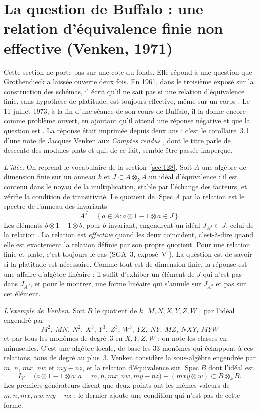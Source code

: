 \section[La question de Buffalo : une relation d'équivalence finie non effective (Venken, 1971)]{La question de Buffalo : une relation d'équivalence finie non effective (Venken, 1971)\protect{}}\label{sec:venken}

Cette section ne porte pas sur une cote du fonds. Elle répond à une question que Grothendieck a laissée ouverte deux fois. En 1961, dans le troisième exposé sur la construction des schémas, il écrit qu'il ne sait pas si une relation d'équivalence finie, sans hypothèse de platitude, est toujours effective, même sur un corps \cite{fga3}. Le 11 juillet 1973, à la fin d'une séance de son cours de Buffalo, il la donne encore comme problème ouvert, en ajoutant qu'il attend une réponse négative et que la question est . La réponse était imprimée depuis deux ans : c'est le corollaire~3.1 d'une note de Jacques Venken aux \emph{Comptes rendus} \cite{venken}, dont le titre parle de descente des modules plats et qui, de ce fait, semble être passée inaperçue.

\emph{L'idée.} On reprend le vocabulaire de la section~\ref{sec:128}. Soit $A$ une algèbre de dimension finie sur un anneau $k$ et $J \subset A \otimes_k A$ un idéal d'équivalence : il est contenu dans le noyau de la multiplication, stable par l'échange des facteurs, et vérifie la condition de transitivité. Le quotient de $\operatorname{Spec} A$ par la relation est le spectre de l'anneau des invariants
\[
  A^J = \{\, a \in A : a \otimes 1 - 1 \otimes a \in J \,\}.
\]
Les éléments $b \otimes 1 - 1 \otimes b$, pour $b$ invariant, engendrent un idéal $J_{A^J} \subset J$, celui de la relation . La relation est \emph{effective} quand les deux coïncident, c'est-à-dire quand elle est exactement la relation définie par son propre quotient. Pour une relation finie et plate, c'est toujours le cas (SGA~3, exposé~V \cite{sga3-1}). La question est de savoir si la platitude est nécessaire. Comme tout est de dimension finie, la réponse est une affaire d'algèbre linéaire : il suffit d'exhiber un élément de $J$ qui n'est pas dans $J_{A^J}$, et pour le montrer, une forme linéaire qui s'annule sur $J_{A^J}$ et pas sur cet élément.

\emph{L'exemple de Venken.} Soit $B$ le quotient de $k[M, N, X, Y, Z, W]$ par l'idéal engendré par
\[
  M^2,\ MN,\ N^2,\ X^3,\ Y^3,\ Z^3,\ W^3,\ YZ,\ NY,\ MZ,\ NXY,\ MYW
\]
et par tous les monômes de degré~$3$ en $X, Y, Z, W$ ; on note les classes en minuscules. C'est une algèbre locale, de base les $33$ monômes qui échappent à ces relations, tous de degré au plus~$3$. Venken considère la sous-algèbre engendrée par $m$, $n$, $mx$, $nw$ et $my - nz$, et la relation d'équivalence sur $\operatorname{Spec} B$ dont l'idéal est
\[
  I_V = \bigl(a \otimes 1 - 1 \otimes a : a = m, n, mx, nw, my - nz\bigr) + (mxy \otimes w) \subset B \otimes_k B .
\]
Les premiers générateurs disent que deux points ont les mêmes valeurs de $m, n, mx, nw, my - nz$ ; le dernier ajoute une condition qui n'est pas de cette forme.

